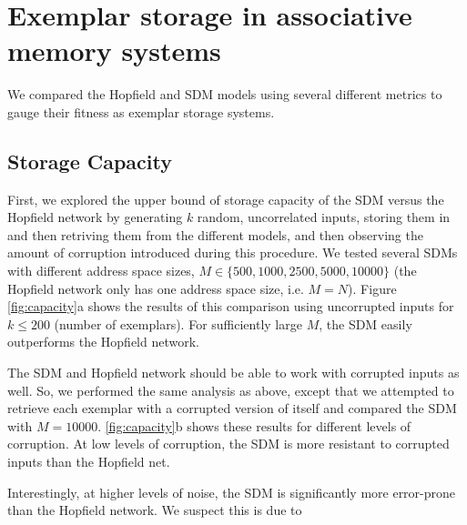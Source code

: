 \documentclass[10pt,letterpaper]{article}
\begin{document}
\section{Exemplar storage in associative memory systems}



We compared the Hopfield and SDM models using several different
metrics to gauge their fitness as exemplar storage systems.

\subsection{Storage Capacity}

First, we explored the upper bound of storage capacity of the SDM
versus the Hopfield network by generating $k$ random, uncorrelated
inputs, storing them in and then retriving them from the different
models, and then observing the amount of corruption introduced during
this procedure. We tested several SDMs with different address space
sizes, $M\in\{500, 1000, 2500, 5000, 10000\}$ (the Hopfield network
only has one address space size, i.e. $M=N$).  Figure
\ref{fig:capacity}a shows the results of this comparison using
uncorrupted inputs for $k\leq 200$ (number of exemplars). For
sufficiently large $M$, the SDM easily outperforms the Hopfield
network.

The SDM and Hopfield network should be able to work with corrupted
inputs as well. So, we performed the same analysis as above, except
that we attempted to retrieve each exemplar with a corrupted version
of itself and compared the SDM with $M=10000$.  \ref{fig:capacity}b
shows these results for different levels of corruption. At low levels
of corruption, the SDM is more resistant to corrupted inputs than the
Hopfield net. 

Interestingly, at higher levels of noise, the SDM is significantly
more error-prone than the Hopfield network. We suspect this is due to
\end{document}
